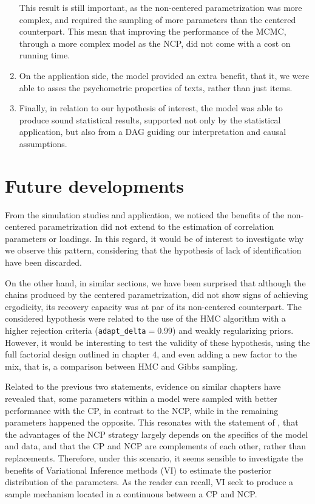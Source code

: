 \begin{enumerate}
	This result is still important, as the non-centered parametrization was more complex, and required the sampling of more parameters than the centered counterpart. This mean that improving the performance of the MCMC, through a more complex model as the NCP, did not come with a cost on running time.
	\item On the application side, the model provided an extra benefit, that it, we were able to asses the psychometric properties of texts, rather than just items.
	\item Finally, in relation to our hypothesis of interest, the model was able to produce sound statistical results, supported not only by the statistical application, but also from a DAG guiding our interpretation and causal assumptions.
\end{enumerate}


\section{Future developments}

From the simulation studies and application, we noticed the benefits of the non-centered parametrization did not extend to the estimation of correlation parameters or loadings. In this regard, it would be of interest to investigate why we observe this pattern, considering that the hypothesis of lack of identification have been discarded.

On the other hand, in similar sections, we have been surprised that although the chains produced by the centered parametrization, did not show signs of achieving ergodicity, its recovery capacity was at par of its non-centered counterpart. The considered hypothesis were related to the use of the HMC algorithm with a higher rejection criteria (\texttt{adapt\_delta}$=0.99$) and weakly regularizing priors. However, it would be interesting to test the validity of these hypothesis, using the full factorial design outlined in chapter $4$, and even adding a new factor to the mix, that is, a comparison between HMC and Gibbs sampling.

Related to the previous two statements, evidence on similar chapters have revealed that, some parameters within a model were sampled with better performance with the CP, in contrast to the NCP, while in the remaining parameters happened the opposite. This resonates with the statement of \citet{Papaspiliopoulos_et_al_2007}, that the advantages of the NCP strategy largely depends on the specifics of the model and data, and that the CP and NCP are complements of each other, rather than replacements. Therefore, under this scenario, it seems sensible to investigate the benefits of Variational Inference methods (VI) to estimate the posterior distribution of the parameters. As the reader can recall, VI seek to produce a sample mechanism located in a continuous between a CP and NCP.

